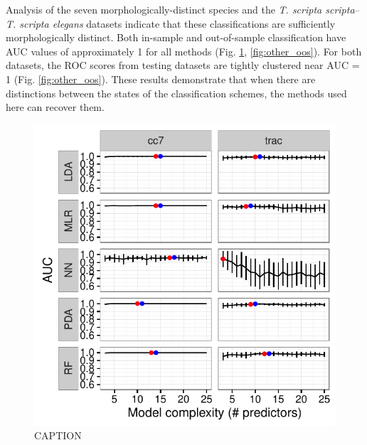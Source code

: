 \documentclass[12pt,letterpaper]{article}
\begin{document}
Analysis of the seven morphologically-distinct species and the \textit{T. scripta scripta}--\textit{T. scripta elegans} datasets indicate that these classifications are sufficiently morphologically distinct. Both in-sample and out-of-sample classification have AUC values of approximately 1 for all methods (Fig. \ref{fig:other_sel}, \ref{fig:other_oos}). For both datasets, the ROC scores from testing datasets are tightly clustered near AUC = 1 (Fig. \ref{fig:other_oos}). These results demonstrate that when there are distinctions between the states of the classification schemes, the methods used here can recover them.

\begin{figure}[ht]
  \centering
  \includegraphics[height = \textheight, width = \textwidth, keepaspectratio = true]{figure/other_model_sel}
  \caption{CAPTION}
  \label{fig:other_sel}
\end{figure}
\end{document}
